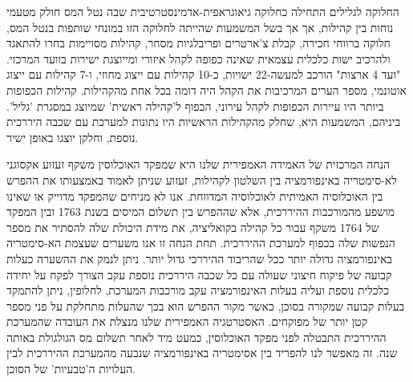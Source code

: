 החלוקה לגלילים התחילה כחלוקה גיאוגראפית-אדמינסטרטיבית שבה נטל המס חולק מטעמי נוחות בין קהילות, אך אך בשל המשמעות שהייתה לחלוקה הזו במונחי שותפות בנטל המס, חלוקה ברווחי חכירה, קבלת צ'ארטרים ופריבלגיות מסחר, קהילות מסויימות בחרו להתאגד ולהרכיב ישות כלכלית עצמאית שאינה כפופה לקהל איזורי ומייוצגת ישירות בוועד המרכזי. "ועד 4 ארצות" הורכב למעשה-22 ישויות, כ-10 קהילות עם ייצוג מחוזי, ו-7 קהילות עם ייצוג אוטונמי, מספר הערים המרכיבות את הקהל היה דומה בכל אחת מהקהילות. קהילות הכפופות ביותר היו עיירות הכפופות לקהל עירוני, הכפוף ל'קהילה ראשית' שמיוצג במסגרת 'גליל'. ביניהם,  המשמעות היא, שחלק מהקהילות הראשיות היו נתונות למערכת עם שכבה היררכית נוספת, וחלקן יוצגו באופן ישיר.

הנחה המרכזית של האמידה האמפירית שלנו היא שמפקד האוכלוסין משקף זעזוע אקסוגני לא-סימטריה באינפורמציה בין השלטון לקהילות, זעזוע שניתן לאמוד באמצעותו את ההפרש בין האוכלוסיה האמיתית לאוכלוסיה המדווחת. אנו לא מניחים שהמפקד מדוייק או שאינו מושפע מהמורכבות ההיררכית, אלא  שההפרש בין תשלום המיסים בשנת 1763 ובין המפקד של 1764 משקף עבור כל קהילה בקואליציה, את מידת היכולת שלה להסתיר את מספר הנפשות שלה בכפוף למערכת ההיררכית. תחת הנחה זו אנו משערים שעצמת הא-סימטריה באינפורמציה גדולה יותר ככל שהריבוד ההיררכי גדול יותר. ניתן לנמק את ההשערה כעלות קבועה של פיקוח חיצוני שעולה עם כל שכבה היררכית נוספת עקב הצורך לפקח על יחידה כלכלית נוספת ועליה בעלות האינפורמציה עקב מורכבות המערכת, לחלופין, ניתן להתמקד בעלות קבועה שמקורה בסוכן, כאשר מקור ההפרש הוא בכך שהעלות מתחלקת על פני מספר קטן יותר של מפוקחים. האסטרטגיה האמפירית שלנו מנצלת את העובדה שהמערכת ההיררכית התבטלה לפני מפקד האוכלוסין, כמעט מיד לאחר תשלום מס הגולגולת באותה שנה. זה מאפשר לנו להפריד בין אסימטריה באינפורמציה שנבעה מהמערכת ההיררכית לבין העלויות ה'טבעיות' של הסוכן.





